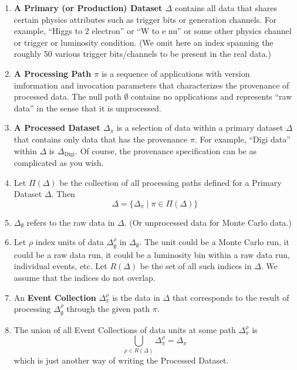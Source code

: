 \documentclass{cmspaper}
\begin{document}
\begin{enumerate}

\item {\bf A Primary (or Production) Dataset $\Delta$} 
contains all data that shares certain physics 
attributes such as trigger bits or generation channels.  For example, ``Higgs to 2 electron''
or ``W to e nu'' or some other physics channel or trigger or luminosity condition.  (We omit 
here an index spanning the roughly 50 various trigger bits/channels to be present in the 
real data.) 

\item {\bf A Processing Path $\pi$} is a sequence of applications with version imformation 
and invocation parameters that
characterizes the provenance of processed data.  The null path $\emptyset$ contains
no applications and represents ``raw data'' in the sense that it is unprocessed.  

\item {\bf A Processed Dataset $\Delta_{\pi}$} is a selection of data within a primary 
dataset $\Delta$ that contains only data that has the provenance $\pi$.  For example, 
``Digi data'' within $\Delta$ is $\Delta_{\mbox{Digi}}$.  Of course, the provenance specification 
can be as complicated as you wish.

\item Let $\Pi(\Delta)$ be the collection of all processing paths defined for a Primary 
Dataset $\Delta $.  Then 
\begin{equation}
    \Delta = \{ \Delta_{\pi} \mid \pi \in \Pi(\Delta) \}
\end{equation}

\item $\Delta_{\emptyset}$ refers to the raw data in $\Delta$. (Or unprocessed data for 
Monte Carlo data.) 

\item Let $\rho$ index units of data $\Delta_{\emptyset}^{\rho}$ 
in $\Delta_{\emptyset}$.  The unit 
could be a Monte Carlo run, it could be a raw data run, 
it could be a luminosity bin within a raw data run, 
individual events, etc.  Let $R(\Delta)$ be the 
set of all such indices in $\Delta$.  We assume that the indices do not overlap.

\item An {\bf Event Collection} $\Delta_{\pi}^{\rho}$ is the 
data in $\Delta$ that corresponds to the result of processing $\Delta_{\emptyset}^{\rho}$ 
through the given path $\pi$.  

\item The union
of all Event Collections of data units at some path $\Delta_{\pi}^{\rho}$ is 
\begin{equation}
\bigcup_{\rho \in R(\Delta)} \Delta_{\pi}^{\rho} = \Delta_{\pi}
\end{equation}
which is just another way of writing the Processed Dataset.  


\end{enumerate}
\end{document}
